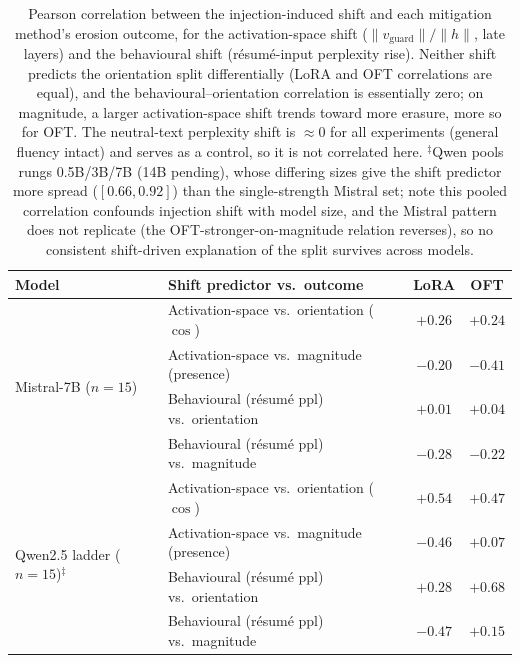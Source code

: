 \begin{table}[t]
\centering
\small
\begin{tabular}{llcc}
\toprule
Model & Shift predictor vs.\ outcome & LoRA & OFT \\
\midrule
\multirow{4}{*}{Mistral-7B ($n{=}15$)}
 & Activation-space vs.\ orientation ($\cos$)  & $+0.26$ & $+0.24$ \\
 & Activation-space vs.\ magnitude (presence)  & $-0.20$ & $-0.41$ \\
 & Behavioural (résumé ppl) vs.\ orientation   & $+0.01$ & $+0.04$ \\
 & Behavioural (résumé ppl) vs.\ magnitude     & $-0.28$ & $-0.22$ \\
\midrule
\multirow{4}{*}{Qwen2.5 ladder ($n{=}15$)$^{\ddagger}$}
 & Activation-space vs.\ orientation ($\cos$)  & $+0.54$ & $+0.47$ \\
 & Activation-space vs.\ magnitude (presence)  & $-0.46$ & $+0.07$ \\
 & Behavioural (résumé ppl) vs.\ orientation   & $+0.28$ & $+0.68$ \\
 & Behavioural (résumé ppl) vs.\ magnitude     & $-0.47$ & $+0.15$ \\
\bottomrule
\end{tabular}
\caption{Pearson correlation between the injection-induced shift and each mitigation
method's erosion outcome, for the activation-space shift ($\lVert
v_\mathrm{guard}\rVert/\lVert h\rVert$, late layers) and the behavioural shift
(résumé-input perplexity rise). Neither shift predicts the orientation split
differentially (LoRA and OFT correlations are equal), and the behavioural--orientation
correlation is essentially zero; on magnitude, a larger activation-space shift trends
toward more erasure, more so for OFT. The neutral-text perplexity shift is $\approx 0$ for
all experiments (general fluency intact) and serves as a control, so it is not correlated
here. $^{\ddagger}$Qwen pools rungs 0.5B/3B/7B (14B pending), whose differing sizes give the
shift predictor more spread ($[0.66, 0.92]$) than the single-strength Mistral set; note this
pooled correlation confounds injection shift with model size, and the Mistral pattern does
not replicate (the OFT-stronger-on-magnitude relation reverses), so no consistent
shift-driven explanation of the split survives across models.}
\label{tab:dist-shift}
\end{table}
